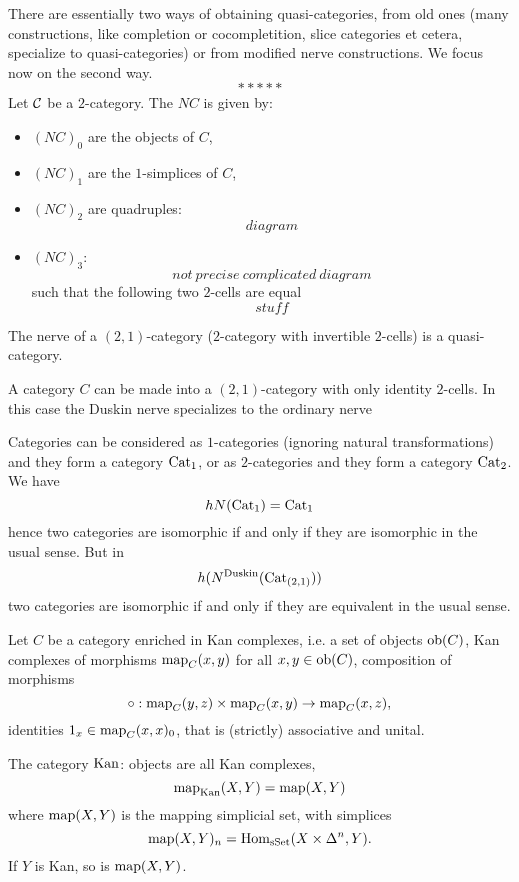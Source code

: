 \begin{example}
There are essentially two ways of obtaining quasi-categories, from old ones (many constructions, like completion or cocompletition, slice categories et cetera, specialize to quasi-categories) or from modified nerve constructions. We focus now on the second way.
\[*****\]
Let $\mathcal{C}$ be a $2$-category. The  $NC$ is given by:
\begin{itemize}
    \item $(NC)_0$ are the objects of $C$,
    \item $(NC)_1$ are the $1$-simplices of $C$,
    \item $(NC)_2$ are quadruples:
    \[diagram\]
    \item $(NC)_3$:
    \[not\ precise\ complicated\ diagram\]
    such that the following two $2$-cells are equal
    \[stuff\]
\end{itemize}
\end{example}

\begin{theorem}
The nerve of a $(2,1)$-category ($2$-category with invertible $2$-cells) is a quasi-category.
\end{theorem}

\begin{remark}
A category $C$ can be made into a $(2,1)$-category with only identity $2$-cells. In this case the Duskin nerve specializes to the ordinary nerve
\end{remark}

\begin{example}
Categories can be considered as $1$-categories (ignoring natural transformations) and they form a category ${\mathrm{Cat}}_1$, or as $2$-categories and they form a category ${\mathrm{Cat}}_2$.
We have
\[hN({\mathrm{Cat}}_1)={\mathrm{Cat}}_1\]
hence two categories are isomorphic if and only if they are isomorphic in the usual sense.
But in
\[h(N^\text{Duskin}({\mathrm{Cat}}_{(2,1)}))\]
two categories are isomorphic if and only if they are equivalent in the usual sense.
\end{example}

Let $C$ be a category enriched in Kan complexes, i.e. a set of objects $\operatorname{ob}(C)$, Kan complexes of morphisms $\operatorname{map}_C(x,y)$ for all $x,y\in\operatorname{ob}(C)$, composition of morphisms
\[\circ:\operatorname{map}_C(y,z)\times\operatorname{map}_C(x,y)\to\operatorname{map}_C(x,z),\]
identities $1_x\in\operatorname{map}_C(x,x)_0$, that is (strictly) associative and unital.

\begin{example}
The category ${\mathrm{Kan}}$: objects are all Kan complexes,
\[\operatorname{map}_{\mathrm{Kan}}(X,Y)=\operatorname{map}(X,Y)\]
where $\operatorname{map}(X,Y)$ is the mapping simplicial set, with simplices
\[\operatorname{map}(X,Y)_n=\operatorname{Hom}_{\mathrm{sSet}}(X\times\Delta^n,Y).\]
If $Y$ is Kan, so is $\operatorname{map}(X,Y)$.
\end{example}

